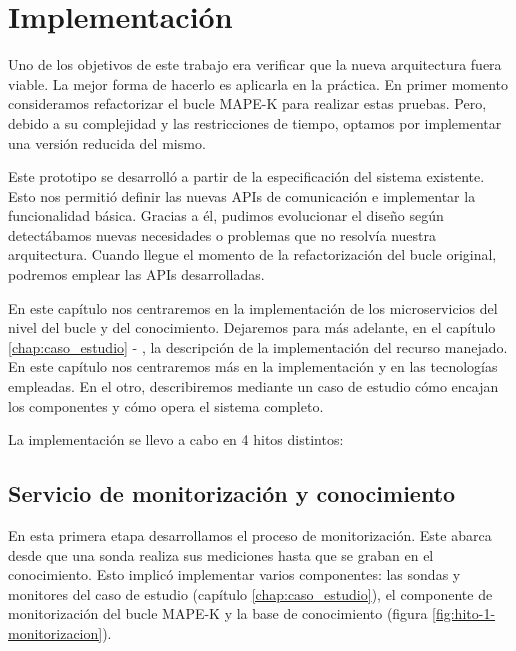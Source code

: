 
\chapter{Implementación}
\label{chap:implementación}

Uno de los objetivos de este trabajo era verificar que la nueva arquitectura fuera viable. La mejor forma de hacerlo es aplicarla en la práctica. En primer momento consideramos refactorizar el bucle MAPE-K  para realizar estas pruebas. Pero, debido a su complejidad y las restricciones de tiempo, optamos por implementar una versión reducida del mismo.

Este prototipo se desarrolló a partir de la especificación del sistema existente. Esto nos permitió definir las nuevas APIs de comunicación e implementar la funcionalidad básica. Gracias a él, pudimos evolucionar el diseño según detectábamos nuevas necesidades o problemas que no resolvía nuestra arquitectura. Cuando llegue el momento de la refactorización del bucle original, podremos emplear las APIs desarrolladas.

En este capítulo nos centraremos en la implementación de los microservicios del nivel del bucle y del conocimiento. Dejaremos para más adelante, en el capítulo \ref{chap:caso_estudio} - , la descripción de la implementación del recurso manejado. En este capítulo nos centraremos más en la implementación y en las tecnologías empleadas. En el otro, describiremos mediante un caso de estudio cómo encajan los componentes y cómo opera el sistema completo.

La implementación se llevo a cabo en 4 hitos distintos:

\section{Servicio de monitorización y conocimiento}

En esta primera etapa desarrollamos el proceso de monitorización. Este abarca desde que una sonda realiza sus mediciones hasta que se graban en el conocimiento. Esto implicó implementar varios componentes: las sondas y monitores del caso de estudio (capítulo \ref{chap:caso_estudio}), el componente de monitorización del bucle MAPE-K y la base de conocimiento (figura \ref{fig:hito-1-monitorizacion}).

